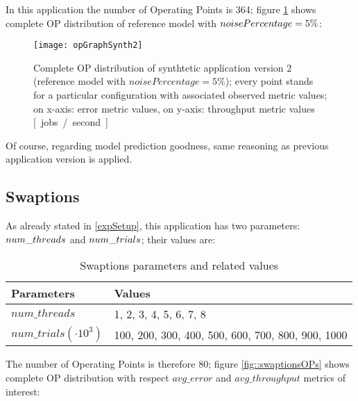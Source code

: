In this application the number of Operating Points is 364; figure \ref{fig::opListSynth2} shows complete OP distribution of reference model with $noise\-Per\-cent\-age = 5\%$:

\begin{figure}[h]

    \centering
    \texttt{[image: opGraphSynth2]}
    \caption[Complete OP distribution of synthtetic application version 2]{Complete OP distribution of synthtetic application version 2 (reference model with $noisePercentage = 5\%$); every point stands for a particular configuration with associated observed metric values; on x-axis: error metric values, on y-axis: throughput metric values \hbox{[ jobs / second ]}}
    \label{fig::opListSynth2}
    
\end{figure}

Of course, regarding model prediction goodness, same reasoning as previous application version is applied.


\subsection{Swaptions}

As already stated in \ref{expSetup}, this application has two parameters: $num\_\-threads$ and $num\_\-trials$; their values are:

\begin{table}[h]

    \centering

    \begin{tabular}{ll}
    
        \toprule
        Parameters & Values \\
        \midrule
        $num\_threads$ & 1, 2, 3, 4, 5, 6, 7, 8 \\
        $num\_trials (\cdot 10^3)$ & 100, 200, 300, 400, 500, 600, 700, 800, 900, 1000 \\
        \bottomrule 
    
    \end{tabular}

    \caption{Swaptions parameters and related values}

\end{table}

The number of Operating Points is therefore 80; figure \ref{fig::swaptionsOPs} shows complete OP distribution with respect $avg\_error$ and $avg\_throughput$ metrics of interest:

